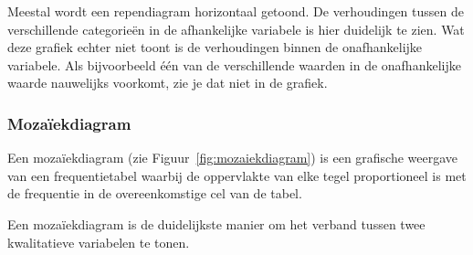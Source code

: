 Meestal wordt een rependiagram horizontaal getoond. De verhoudingen tussen de verschillende categorieën in de afhankelijke variabele is hier duidelijk te zien. Wat deze grafiek echter niet toont is de verhoudingen binnen de onafhankelijke variabele. Als bijvoorbeeld één van de verschillende waarden in de onafhankelijke waarde nauwelijks voorkomt, zie je dat niet in de grafiek.

\subsubsection{Mozaïekdiagram}

Een mozaïekdiagram (zie Figuur~\ref{fig:mozaiekdiagram}) is een grafische weergave van een frequentietabel waarbij de oppervlakte van elke tegel proportioneel is met de frequentie in de overeenkomstige cel van de tabel.

Een mozaïekdiagram is de duidelijkste manier om het verband tussen twee kwalitatieve variabelen te tonen.

